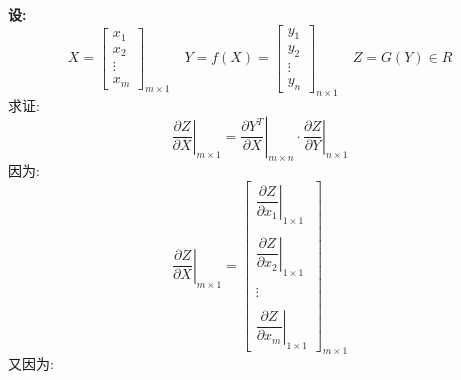 \documentclass[withoutpreface,bwprint]{cumcmthesis} %
\begin{document}
	\par \textbf{设:}
		\begin{equation*}
			X=\left[
				\begin{array}{c}
					x_1\\
					x_2\\
					\vdots\\
					x_m
				\end{array}
			\right]_{m{\times}1}
			\quad
			Y=f(X)=\left[
			\begin{array}{c}
				y_1\\
				y_2\\
				\vdots\\
				y_n
			\end{array}
			\right]_{n{\times}1}
			\quad
			Z=G(Y) \in R
		\end{equation*}
	求证:\\
	\begin{equation}
		\left. \dfrac{\partial Z}{\partial X} \right|_{m{\times}1}=\left. \dfrac{\partial Y^T}{\partial X} \right|_{m{\times}n} \cdot \left. \dfrac{\partial Z}{\partial Y} \right|_{n{\times}1} \label{con:inventoryflow2}
	\end{equation}
	因为:\\
	\begin{equation}
		\left. \dfrac{\partial Z}{\partial X} \right|_{m{\times}1}=\left[
		\begin{array}{c}
				\left. \dfrac{\partial Z}{\partial x_1} \right|_{1{\times}1}\\\\
				\left. \dfrac{\partial Z}{\partial x_2} \right|_{1{\times}1}\\\\
				\vdots \\\\
				\left. \dfrac{\partial Z}{\partial x_m} \right|_{1{\times}1}
		\end{array}
	\right]_{m{\times}1}
	\end{equation}
	又因为:\\
\end{document}
